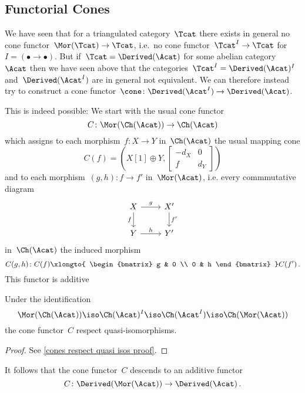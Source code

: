 \documentclass[a4paper,10pt]{scrartcl}
\begin{document}
\subsection{Functorial Cones}

We have seen that for a triangulated category~$\Tcat$ there exists in general no cone functor~$\Mor(\Tcat) \to \Tcat$, i.e.\ no cone functor~$\Tcat^I \to \Tcat$ for~$I = (\bullet \to \bullet)$.
But if~$\Tcat = \Derived(\Acat)$ for some abelian category~$\Acat$ then we have seen above that the categories~$\Tcat^I = \Derived(\Acat)^I$ and~$\Derived(\Acat^I)$ are in general not equivalent.
We can therefore instead try to construct a cone functor~$\cone \colon \Derived(\Acat^I) \to \Derived(\Acat)$.

This is indeed possible:
We start with the usual cone functor
\[
  C
  \colon
  \Mor(\Ch(\Acat))
  \to
  \Ch(\Acat)
\]
which assigns to each morphism~$f \colon X \to Y$ in~$\Ch(\Acat)$ the usual mapping cone
\[
  C(f)
  =
  \left(
    X[1] \oplus Y,
    \begin{bmatrix}
      -d_X & 0   \\
        f   & d_Y
    \end{bmatrix}
  \right)
\]
and to each morphism~$(g,h) \colon f \to f'$ in~$\Mor(\Acat)$, i.e. every commmutative diagram
\[
  \begin{tikzcd}
    X
    \arrow{r}[above]{g}
    \arrow{d}[left]{f}
    &
    X'
    \arrow{d}[right]{f'}
    \\
    Y
    \arrow{r}[above]{h}
    &
    Y'
  \end{tikzcd}
\]
in~$\Ch(\Acat)$ the induced morphism
\[
  C(g,h)
  \colon
  C(f)
  \xlongto{ \begin{bmatrix} g & 0 \\ 0 & h \end{bmatrix} }
  C(f') \,.
\]
This functor is additive

\begin{lemma}
  \label{cones respect quasi isos}
  Under the identification
  \[
    \Mor(\Ch(\Acat))
    \iso
    \Ch(\Acat)^I
    \iso
    \Ch(\Acat^I)
    \iso
    \Ch(\Mor(\Acat))
  \]
  the cone functor~$C$ respect quasi-isomorphisms.
\end{lemma}

\begin{proof}
  See \cref{cones respect quasi isos proof}.
\end{proof}

It follows that the cone functor~$C$ descends to an additive functor
\[
  C
  \colon
  \Derived( \Mor(\Acat) )
  \to
  \Derived( \Acat ) \,.
\]
\end{document}
